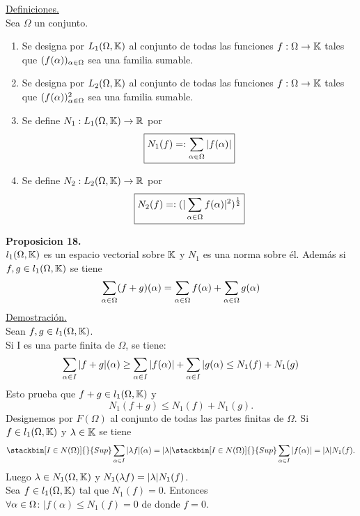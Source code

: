 \underline{Definiciones.} \\
Sea $\Omega$ un conjunto. 
\begin{enumerate}[1)]
\item Se designa por $L_1(\Omega ,\mathbb{K})$ al conjunto de todas las funciones $f: \Omega \rightarrow \mathbb{K}$ tales que $(f(\alpha))_{\alpha \in \Omega}$ sea una familia sumable. 
\item Se designa por $L_2(\Omega ,\mathbb{K})$ al conjunto de todas las funciones  $f: \Omega \rightarrow \mathbb{K}$ tales que $(f(\alpha))_{\alpha \in \Omega}^2$ sea una familia sumable. 
\item Se define $N_1:L_1(\Omega ,\mathbb{K})\rightarrow \mathbb{R}$ por 
\begin{equation*}
\boxed{N_1 (f)=: \sum_{\alpha \in \Omega}| f(\alpha)|}
\end{equation*}
\item Se define $N_2:L_2(\Omega ,\mathbb{K})\rightarrow \mathbb{R}$ por
\begin{equation*}
\boxed{N_2 (f)=:(| \sum_{\alpha \in \Omega}f(\alpha) |^2)^{\frac{1}{2}}}
\end{equation*}
\end{enumerate}
\textbf{Proposicion 18.}\\
$l_1 (\Omega,\mathbb{K})$ es un espacio vectorial sobre $\mathbb{K}$ y $N_1$ es una norma sobre él. Además si $f,g \in l_1 (\Omega,\mathbb{K})$ se tiene
\begin{equation*}
\sum_{\alpha \in \Omega}(f+g)(\alpha)= \sum_{\alpha \in \Omega}f(\alpha)+\sum_{\alpha \in \Omega}g(\alpha)
\end{equation*}
\underline{Demostración.} \\
Sean $f,g \in l_1 (\Omega,\mathbb{K})$. \\
Si I es una parte finita de $\Omega$, se tiene:
$$
\sum_{\alpha \in I}| f+g| (\alpha) \geq \sum_{\alpha \in I}|f(\alpha)|+ \sum_{\alpha \in I} | g(\alpha) \leq N_1 (f)+N_1(g)
$$
Esto prueba que $f+g\in l_1 (\Omega,\mathbb{K})$ y 
$$
N_1 (f+g) \leq N_1 (f) + N_1(g).
$$
Designemos por $F (\Omega)$ al conjunto de todas las partes finitas de $\Omega$. Si $f \in l_1 (\Omega,\mathbb{K})$ y $\lambda \in \mathbb{K}$ se tiene
$$
 \stackbin[I \en N (\Omega)]{}{Sup}  \sum_{\alpha \en I}| \lam f| (\alpha)=| \lam |  \stackbin[I \en N (\Omega)]{}{Sup}  \sum_{\alpha \en I} | f(\alpha)| = | \lam | N_1 (f).
$$
Luego $\lambda \in N_1 (\Omega ,\mathbb{K})$ y $N_1 (\lambda f)=| \lambda | N_1 (f)$. \\
Sea $f \in l_1 (\Omega ,\mathbb{K})$ tal que $N_1 (f)=0$. Entonces \\
$\forall \alpha \in \Omega$: $| f(\alpha) \leq N_1 (f)=0$ de donde $f=0$.\\
